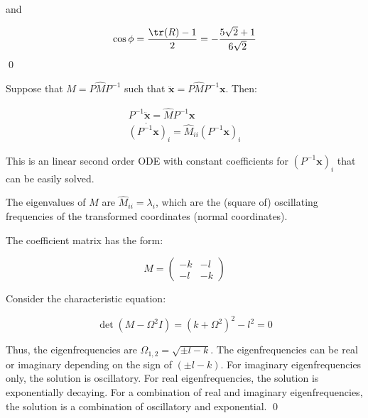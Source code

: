 \documentclass[12pt]{article}
\begin{document}
and

\begin{equation}
    \cos{\phi} = \frac{\tr(R) - 1}{2} = - \frac{5\sqrt{2} + 1}{6\sqrt{2}}
\end{equation}
\qed



Suppose that $M = P \hat{M} P^{-1}$ such that $\ddot{\mathbf{x}} = P \hat{M} P^{-1} \mathbf{x}$. Then:

\begin{equation}
    \begin{split}
        P^{-1} \ddot{\mathbf{x}} = \hat{M} P^{-1} \mathbf{x} \\
        \ddot{(P^{-1} \mathbf{x})}_{i} = \hat{M}_{ii} (P^{-1} \mathbf{x})_{i}
    \end{split}
\end{equation}

This is an linear second order ODE with constant coefficients for $(P^{-1} \mathbf{x})_{i}$ that can be easily solved.

The eigenvalues of $M$ are $\hat{M}_{ii} = \lambda_{i}$, which are the (square of) oscillating frequencies of the transformed coordinates (normal coordinates).

The coefficient matrix has the form:

\begin{equation}
    M = \begin{pmatrix}
        -k & -l \\
        -l & -k
    \end{pmatrix}
\end{equation}

Consider the characteristic equation:

\begin{equation}
    \det(M - \Omega^{2} I) = (k + \Omega^{2})^{2} - l^{2} = 0
\end{equation}

Thus, the eigenfrequencies are $\Omega_{1, 2} = \sqrt{\pm l - k}$. The eigenfrequencies can be real or imaginary depending on the sign of $(\pm l - k)$. For imaginary eigenfrequencies only, the solution is oscillatory. For real eigenfrequencies, the solution is exponentially decaying. For a combination of real and imaginary eigenfrequencies, the solution is a combination of oscillatory and exponential.
\qed
\end{document}
